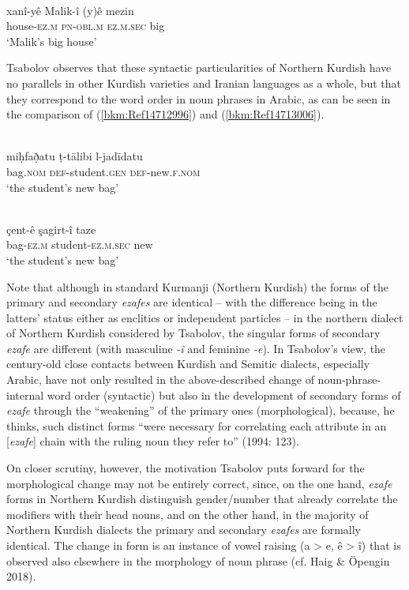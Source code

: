 \documentclass[output=paper]{langsci/langscibook}
\begin{document}
\ea\label{ex:opengin:}
\\
\gll xanî-yê Malik-î (y)ê mezin\\
     house-\textsc{ez.m} \textsc{pn-obl.m} \textsc{ez.m.sec} big\\
\glt ‘Malik’s big house’
\z

Tsabolov observes that these syntactic particularities of Northern Kurdish have no parallels in other Kurdish varieties and Iranian languages as a whole, but that they correspond to the word order in noun phrases in Arabic, as can be seen in the comparison of (\ref{bkm:Ref14712996}) and (\ref{bkm:Ref14713006}). 

\ea\label{ex:opengin:}
\\
\gll miḥfað̣atu ṭ-tālibi l-jadīdatu\\
     bag\textsc{.nom} \textsc{def}{}-student.\textsc{gen} \textsc{def}{}-new.\textsc{f.nom} \\
\glt ‘the student’s new bag’
\z

\ea\label{ex:opengin:}
\\
\gll çent-ê şagirt-î taze\\
     bag-\textsc{ez.m} student-\textsc{ez.m.sec} new\\
\glt ‘the student’s new bag’
\z

Note that although in standard Kurmanji (Northern Kurdish) the forms of the primary and secondary \textit{ezafes} are identical – with the difference being in the latters’ status either as enclitics or independent particles – in the northern dialect of Northern Kurdish considered by Tsabolov, the singular forms of secondary \textit{ezafe} are different (with masculine \textit{{}-î} and feminine \textit{{}-e}). In Tsabolov’s view, the century-old close contacts between Kurdish and Semitic dialects, especially Arabic, have not only resulted in the above-described change of noun-phrase-internal word order (syntactic) but also in the development of secondary forms of \textit{ezafe} through the “weakening” of the primary ones (morphological), because, he thinks, such distinct forms “were necessary for correlating each attribute in an [\textit{ezafe}] chain with the ruling noun they refer to” (1994: 123). 

On closer scrutiny, however, the motivation Tsabolov puts forward for the morphological change may not be entirely correct, since, on the one hand, \textit{ezafe} forms in Northern Kurdish distinguish gender/number that already correlate the modifiers with their head nouns, and on the other hand, in the majority of Northern Kurdish dialects the primary and secondary \textit{ezafes} are formally identical. The change in form is an instance of vowel raising (a > e, ê > î) that is observed also elsewhere in the morphology of noun phrase (cf. Haig \& Öpengin 2018). 
\end{document}

